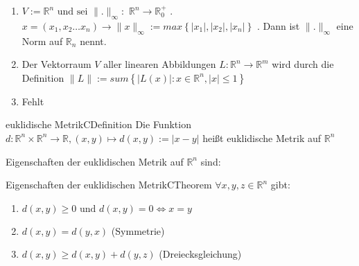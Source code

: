 \documentclass[a4paper]{memoir}
\begin{document}

\begin{enumerate}[label=\alph*)]
    \item $ V := \mathbb{R}^{n} \text{ und sei } \|. \|_{\infty}:$
        $\mathbb{R}^{n} \to \mathbb{R}_{0}^+$ . $ x = \left( x_1,x_2 \dots
        x_{n}\right) \to \|x \|_{\infty}:= max \left\{ \left| x_1 \right| , \left| x_2 \right|, \left| x_{n} \right| \right\}$ . Dann ist $ \|. \|_{
    \infty}$ eine Norm auf $ \mathbb{R}_{n} $ nennt.
    \item Der Vektorraum $ V $ aller linearen Abbildungen $ L : \mathbb{R}^n
        \to \mathbb{R}^m$ wird durch die Definition $ \|L \|:= sum \left\{ 
        \left| L(x)\right| : x \in \mathbb{R}^{n}, \left| x \right| 
    \leq 1 \right\}  $ 
    \item Fehlt
\end{enumerate}

\begin{ibox}{euklidische Metrik}{CDefinition}
    Die Funktion $ d: \mathbb{R}^{n}\times \mathbb{R}^{n} \to \mathbb{R}
, (x,y) \mapsto d(x,y) := |x-y|$ heißt euklidische Metrik auf
$ \mathbb{R}^{n}$
\end{ibox}
Eigenschaften der euklidischen Metrik auf $ \mathbb{R}^{n} $ sind:
\begin{ibox}{Eigenschaften der euklidischen Metrik}{CTheorem}
    $ \forall x,y,z \in \mathbb{R}^{n} $ gibt:
    \begin{enumerate}[label=\alph*)]
        \item $ d(x,y) \geq 0 \text{ und } d(x,y) = 0 \iff x = y $ 
        \item $ d(x,y) = d(y,x) $ (Symmetrie)
        \item $ d(x,y) \geq d(x,y) + d(y,z) $ (Dreiecksgleichung)
    \end{enumerate}
    
\end{ibox}
\end{document}
